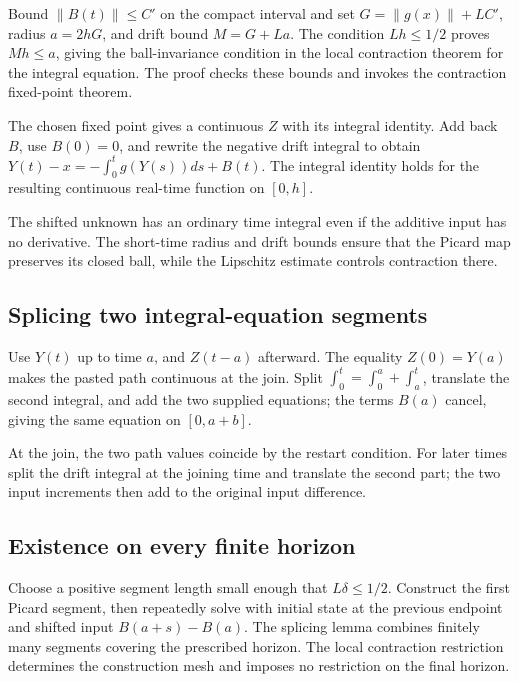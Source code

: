 \documentclass[11pt,a4paper]{report}
\begin{document}
Bound \(\|B(t)\|\le C'\) on the compact interval and set \(G=\|g(x)\|+LC'\), radius \(a=2hG\), and drift bound \(M=G+La\). The condition \(Lh\le1/2\) proves \(Mh\le a\), giving the ball-invariance condition in the local contraction theorem for the integral equation. The proof checks these bounds and invokes the contraction fixed-point theorem.



The chosen fixed point gives a continuous \(Z\) with its integral identity. Add back \(B\), use \(B(0)=0\), and rewrite the negative drift integral to obtain \(Y(t)-x=-\int_0^tg(Y(s))ds+B(t)\). The integral identity holds for the resulting continuous real-time function on \([0,h]\).



The shifted unknown has an ordinary time integral even if the additive input has no derivative. The short-time radius and drift bounds ensure that the Picard map preserves its closed ball, while the Lipschitz estimate controls contraction there.

\subsection{\texorpdfstring{Splicing two integral-equation segments}{Splicing two integral-equation segments}}
\label{report-step-UnadjustedLangevin-LangevinIntegral-lean-2}


Use \(Y(t)\) up to time \(a\), and \(Z(t-a)\) afterward. The equality \(Z(0)=Y(a)\) makes the pasted path continuous at the join. Split \(\int_0^t=\int_0^a+\int_a^t\), translate the second integral, and add the two supplied equations; the terms \(B(a)\) cancel, giving the same equation on \([0,a+b]\).



At the join, the two path values coincide by the restart condition. For later times split the drift integral at the joining time and translate the second part; the two input increments then add to the original input difference.

\subsection{\texorpdfstring{Existence on every finite horizon}{Existence on every finite horizon}}
\label{report-step-UnadjustedLangevin-LangevinIntegral-lean-3}


Choose a positive segment length small enough that \(L\delta\le1/2\). Construct the first Picard segment, then repeatedly solve with initial state at the previous endpoint and shifted input \(B(a+s)-B(a)\). The splicing lemma combines finitely many segments covering the prescribed horizon. The local contraction restriction determines the construction mesh and imposes no restriction on the final horizon.
\end{document}
